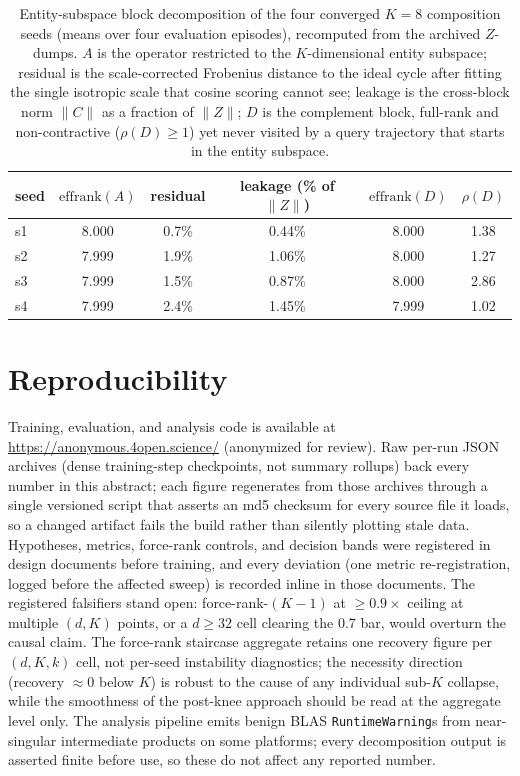 \begin{table}[!htb]
\centering
\small
\begin{tabular}{lccccc}
\toprule
seed & $\mathrm{effrank}(A)$ & residual & leakage (\% of $\|Z\|$) & $\mathrm{effrank}(D)$ & $\rho(D)$ \\
\midrule
s1 & 8.000 & 0.7\% & 0.44\% & 8.000 & 1.38 \\
s2 & 7.999 & 1.9\% & 1.06\% & 8.000 & 1.27 \\
s3 & 7.999 & 1.5\% & 0.87\% & 8.000 & 2.86 \\
s4 & 7.999 & 2.4\% & 1.45\% & 7.999 & 1.02 \\
\bottomrule
\end{tabular}
\caption{Entity-subspace block decomposition of the four converged
$K{=}8$ composition seeds (means over four evaluation episodes),
recomputed from the archived $Z$-dumps. $A$ is the operator restricted
to the $K$-dimensional entity subspace; residual is the scale-corrected
Frobenius distance to the ideal cycle after fitting the single isotropic
scale that cosine scoring cannot see; leakage is the cross-block norm
$\|C\|$ as a fraction of $\|Z\|$; $D$ is the complement block, full-rank
and non-contractive ($\rho(D) \geq 1$) yet never visited by a query
trajectory that starts in the entity subspace.}
\label{tab:subspace}
\end{table}

\section{Reproducibility}
\label{app:repro}

Training, evaluation, and analysis code is available at
\url{https://anonymous.4open.science/} (anonymized for review). Raw
per-run JSON archives (dense training-step checkpoints, not summary
rollups) back every number in this abstract; each figure regenerates
from those archives through a single versioned script that asserts an
md5 checksum for every source file it loads, so a changed artifact fails
the build rather than silently plotting stale data. Hypotheses, metrics,
force-rank controls, and decision bands were registered in design
documents before training, and every deviation (one metric
re-registration, logged before the affected sweep) is recorded inline
in those documents. The registered falsifiers stand open:
force-rank-$(K{-}1)$ at $\geq 0.9\times$ ceiling at multiple $(d, K)$
points, or a $d \geq 32$ cell clearing the 0.7 bar, would overturn the
causal claim.
The force-rank staircase aggregate retains one recovery figure per
$(d, K, k)$ cell, not per-seed instability diagnostics; the necessity
direction (recovery $\approx 0$ below $K$) is robust to the cause of
any individual sub-$K$ collapse, while the smoothness of the post-knee
approach should be read at the aggregate level only.
The analysis pipeline emits benign BLAS \texttt{RuntimeWarning}s from
near-singular intermediate products on some platforms; every
decomposition output is asserted finite before use, so these do not
affect any reported number.
